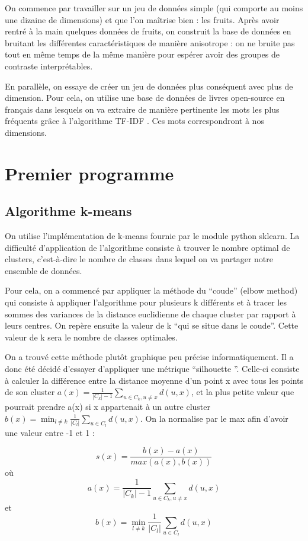 \documentclass[a4paper,10pt]{article}
\begin{document}
On commence par travailler sur un jeu de données simple (qui comporte au moins une dizaine de dimensions) et que l’on maîtrise bien : les fruits. Après avoir rentré à la main quelques données de fruits, on construit la base de données en bruitant les différentes caractéristiques de manière anisotrope : on ne bruite pas tout en même temps de la même manière pour espérer avoir des groupes de contraste interprétables.

En parallèle, on essaye de créer un jeu de données plus conséquent avec plus de dimension. Pour cela, on utilise une base de données de livres open-source en français dans lesquels on va extraire de manière pertinente les mots les plus fréquents grâce à l'algorithme TF-IDF \cite{ref1}. Ces mots correspondront à nos dimensions.


\section{Premier programme}

\subsection{Algorithme k-means}

On utilise l’implémentation de k-means fournie par le module python sklearn.
La difficulté d’application de l’algorithme consiste à trouver le nombre optimal de clusters, c’est-à-dire le nombre de classes dans lequel on va partager notre ensemble de données. 

Pour cela, on a commencé par appliquer la méthode du “coude” (elbow method) qui consiste à appliquer l’algorithme pour plusieurs k différents et à tracer les sommes des variances de la distance euclidienne de chaque cluster par rapport à leurs centres. On repère ensuite la valeur de k “qui se situe dans le coude”. Cette valeur de k sera le nombre de classes optimales.

On a trouvé cette méthode plutôt graphique peu précise informatiquement. Il a donc été décidé d’essayer d’appliquer une métrique “silhouette ”\cite{ref}. Celle-ci consiste à calculer la différence entre la distance moyenne d’un point x avec tous les points de son cluster $a(x)=\frac{1}{|C_{k}|-1}\sum_{u \in C_{k},u\neq x}d(u,x)$, et la plus petite valeur que pourrait prendre a(x) si x appartenait à un autre cluster $b(x)=\min_{l\neq k} \frac{1}{|C_{l}|}\sum_{u \in C_{l}}d(u,x)$. On la normalise par le max afin d'avoir une valeur entre -1 et 1 :

\[s(x)=\frac{b(x)-a(x)}{max(a(x),b(x))}\] où \[a(x)=\frac{1}{|C_{k}|-1}\sum_{u \in C_{k},u\neq x}d(u,x)\]  et \[b(x)=\min_{l\neq k} \frac{1}{|C_{l}|}\sum_{u \in C_{l}}d(u,x)\]
\end{document}
